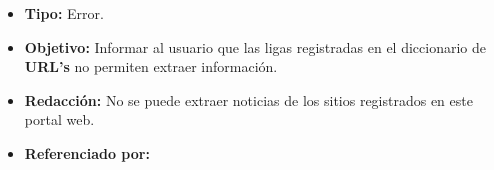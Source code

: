   \begin{itemize}
    \item \textbf{Tipo:} Error. 
    \item \textbf{Objetivo:}  Informar al usuario que las ligas registradas en el diccionario de \textbf{URL's} no permiten extraer información.
    \item \textbf{Redacción:} No se puede extraer noticias de los sitios registrados en este portal web.
    \item \textbf{Referenciado por:} \\
  \end{itemize}

